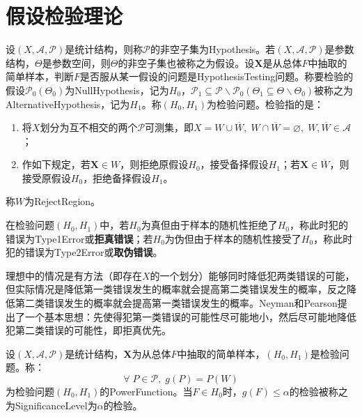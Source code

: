 \chapter{假设检验理论}
\begin{definition}
	设$(X,\mathscr{A},\mathscr{P})$是统计结构，则称$\mathscr{P}$的非空子集为\gls{Hypothesis}。若$(X,\mathscr{A},\mathscr{P})$是参数结构，$\Theta$是参数空间，则$\Theta$的非空子集也被称之为假设。设$\mathbf{X}$是从总体$F$中抽取的简单样本，判断$F$是否服从某一假设的问题是\gls{HypothesisTesting}问题。称要检验的假设$\mathscr{P}_0(\Theta_0)$为\gls{NullHypothesis}，记为$H_0$，$\mathscr{P_1}\subseteq\mathscr{P}\backslash\mathscr{P}_0(\Theta_1\subseteq\Theta\backslash\Theta_0)$被称之为\gls{AlternativeHypothesis}，记为$H_1$。称$(H_0,H_1)$为检验问题。检验指的是：
	\begin{enumerate}
		\item 将$X$划分为互不相交的两个$\mathscr{P}$可测集，即$X=W\cup\overline{W},\;W\cap\overline{W}=\varnothing,\;W,\overline{W}\in\mathscr{A}$；
		\item 作如下规定，若$\mathbf{X}\in W$，则拒绝原假设$H_0$，接受备择假设$H_1$；若$\mathbf{X}\in\overline{W}$，则接受原假设$H_0$，拒绝备择假设$H_1$。
	\end{enumerate}
	称$W$为\gls{RejectRegion}。
\end{definition}
\begin{definition}
	在检验问题$(H_0,H_1)$中，若$H_0$为真但由于样本的随机性拒绝了$H_0$，称此时犯的错误为\gls{Type1Error}或\textbf{拒真错误}；若$H_0$为伪但由于样本的随机性接受了$H_0$，称此时犯的错误为\gls{Type2Error}或\textbf{取伪错误}。
\end{definition}
\begin{note}
	理想中的情况是有方法（即存在$X$的一个划分）能够同时降低犯两类错误的可能，但实际情况是降低第一类错误发生的概率就会提高第二类错误发生的概率，反之降低第二类错误发生的概率就会提高第一类错误发生的概率。Neyman和Pearson提出了一个基本思想：先使得犯第一类错误的可能性尽可能地小，然后尽可能地降低犯第二类错误的可能性，即拒真优先。
\end{note}
\begin{definition}
	设$(X,\mathscr{A},\mathscr{P})$是统计结构，$\mathbf{X}$为从总体$F$中抽取的简单样本，$(H_0,H_1)$是检验问题。称：
	\begin{equation*}
		\forall\;P\in\mathscr{P},\;g(P)=P(W)
	\end{equation*}
	为检验问题$(H_0,H_1)$的\gls{PowerFunction}。当$F\in H_0$时，$g(F)\leqslant\alpha$的检验被称之为\gls{SignificanceLevel}为$\alpha$的检验。
\end{definition}
